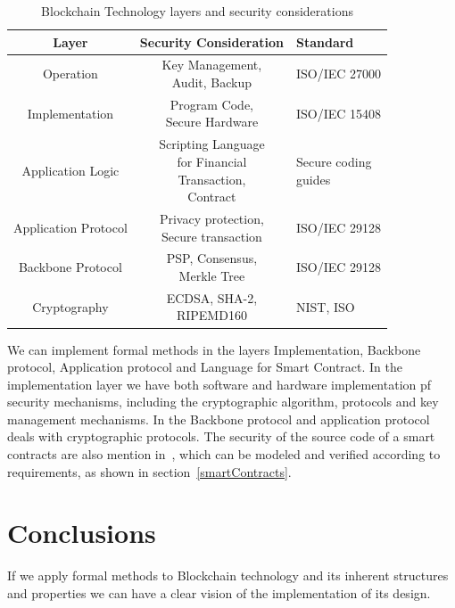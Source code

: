 \documentclass[sigconf, nonacm]{acmart}
\begin{document}
  \begin{table}
    \caption{Blockchain Technology layers and security considerations}
    \label{tab:security-layers}
    \begin{tabularx}{\linewidth}{ccl}
      \toprule
      Layer&Security Consideration& Standard \\
      \toprule
      Operation & \makecell{Key Management,\\Audit, Backup} & ISO/IEC 27000 \\ 
      \midrule
      Implementation & \makecell{Program Code,\\Secure Hardware} & ISO/IEC 15408 \\ 
      \midrule
      Application Logic & \makecell{Scripting Language\\for Financial\\Transaction,\\ Contract} & \makecell{Secure coding\\guides} \\ 
      \midrule
      Application Protocol & \makecell{Privacy protection,\\Secure transaction} & ISO/IEC 29128 \\ 
      \midrule
      Backbone Protocol & \makecell{PSP, Consensus,\\Merkle Tree} & ISO/IEC 29128 \\ 
      \midrule
      Cryptography & \makecell{ECDSA, SHA-2,\\RIPEMD160} & NIST, ISO \\
      \bottomrule
  \end{tabularx}
  \end{table}

We can implement formal methods in the layers Implementation, Backbone protocol, Application protocol and Language for Smart Contract.
In the implementation layer we have both software and hardware implementation pf security mechanisms, including the cryptographic algorithm,
protocols and key management mechanisms. In the Backbone protocol and application protocol deals with cryptographic protocols.
The security of the source code of a smart contracts are also mention in~\cite{Matsuo2017}, which can be modeled and verified according to requirements,
as shown in section~\ref{smartContracts}.

\section{Conclusions}\label{conclusions}
If we apply formal methods to Blockchain technology and its inherent structures and properties we can have a clear vision of the implementation
of its design.
\end{document}
